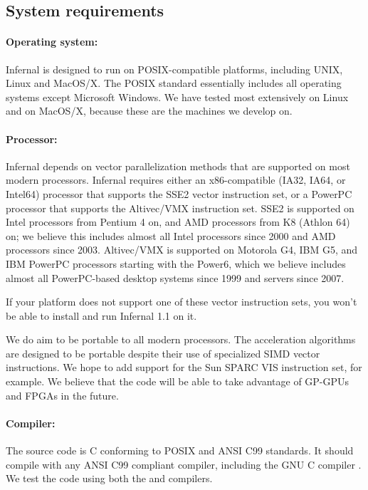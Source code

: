 \subsection{System requirements}

\paragraph{Operating system:} Infernal is designed to run on
POSIX-compatible platforms, including UNIX, Linux and MacOS/X. The
POSIX standard essentially includes all operating systems except
Microsoft Windows. We have tested most extensively on Linux and on
MacOS/X, because these are the machines we develop on.

\paragraph{Processor:} Infernal depends on vector parallelization methods
that are supported on most modern processors. Infernal requires either an
x86-compatible (IA32, IA64, or Intel64) processor that supports the
SSE2 vector instruction set, or a PowerPC processor that supports the
Altivec/VMX instruction set. SSE2 is supported on Intel processors
from Pentium 4 on, and AMD processors from K8 (Athlon 64) on; we
believe this includes almost all Intel processors since 2000 and AMD
processors since 2003. Altivec/VMX is supported on Motorola G4, IBM
G5, and IBM PowerPC processors starting with the Power6, which we
believe includes almost all PowerPC-based desktop systems since 1999
and servers since 2007.

If your platform does not support one of these vector instruction
sets, you won't be able to install and run Infernal 1.1 on it.

We do aim to be portable to all modern processors. The acceleration
algorithms are designed to be portable despite their use of
specialized SIMD vector instructions. We hope to add support for the
Sun SPARC VIS instruction set, for example. We believe that the code
will be able to take advantage of GP-GPUs and FPGAs in the future.

\paragraph{Compiler:} The source code is C conforming to POSIX and ANSI
C99 standards. It should compile with any ANSI C99 compliant compiler,
including the GNU C compiler . 
We test the code using both
the  and  compilers.

